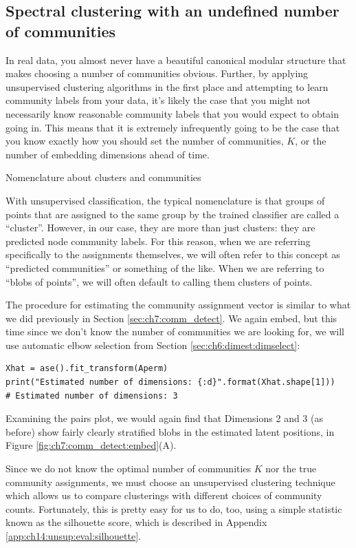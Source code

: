 \subsection{Spectral clustering with an undefined number of communities}
\label{sec:ch7:comm_detect:unknown}

In real data, you almost never have a beautiful canonical modular structure that makes choosing a number of communities obvious. Further, by applying unsupervised clustering algorithms in the first place and attempting to learn community labels from your data, it's likely the case that you might not necessarily know reasonable community labels that you would expect to obtain going in. This means that it is extremely infrequently going to be the case that you know exactly how you should set the number of communities, $K$, or the number of embedding dimensions ahead of time.

\begin{floatingbox}[h]\caption{Nomenclature about clusters and communities}
With unsupervised classification, the typical nomenclature is that groups of points that are assigned to the same group by the trained classifier are called a ``cluster''. However, in our case, they are more than just clusters: they are predicted node community labels. For this reason, when we are referring specifically to the assignments themselves, we will often refer to this concept as ``predicted communities'' or something of the like. When we are referring to ``blobs of points'', we will often default to calling them clusters of points. 
\end{floatingbox}

The procedure for estimating the community assignment vector is similar to what we did previously in Section \ref{sec:ch7:comm_detect}. We again embed, but this time since we don't know the number of communities we are looking for, we will use automatic elbow selection from Section \ref{sec:ch6:dimest:dimselect}:

\begin{lstlisting}[style=python]
Xhat = ase().fit_transform(Aperm)
print("Estimated number of dimensions: {:d}".format(Xhat.shape[1]))
# Estimated number of dimensions: 3
\end{lstlisting}
Examining the pairs plot, we would again find that Dimensions 2 and 3 (as before) show fairly clearly stratified blobs in the estimated latent positions, in Figure \ref{fig:ch7:comm_detect:embed}(A). 

Since we do not know the optimal number of communities $K$ nor the true community assignments, we must choose an unsupervised clustering technique which allows us to compare clusterings with different choices of community counts. Fortunately, this is pretty easy for us to do, too, using a simple statistic known as the silhouette score, which is described in Appendix \ref{app:ch14:unsup:eval:silhouette}.

